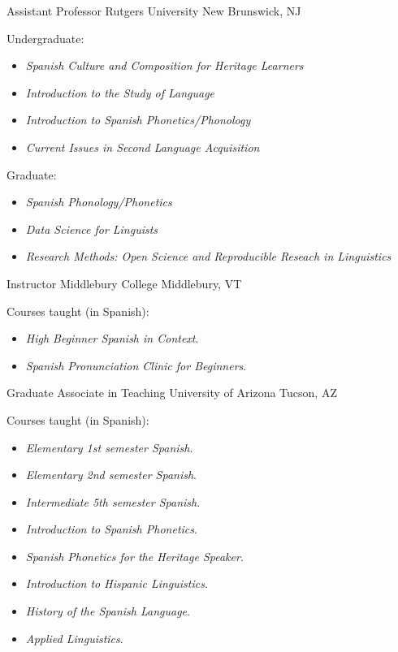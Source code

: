 \documentclass[11pt,letterpaper]{assets/tex/moderncv}
\begin{document}
        {Assistant Professor}
        {Rutgers University}
        {New Brunswick, NJ}
        {}
        {
        Undergraduate:
        \begin{itemize}
            \item[] \small \emph{Spanish Culture and Composition for Heritage Learners}
            \item[] \small \emph{Introduction to the Study of Language}
            \item[] \small \emph{Introduction to Spanish Phonetics/Phonology}
            \item[] \small \emph{Current Issues in Second Language Acquisition}
        \end{itemize}
        Graduate:
        \begin{itemize}
            \item[] \small \emph{Spanish Phonology/Phonetics}
            \item[] \small \emph{Data Science for Linguists}
            \item[] \small \emph{Research Methods: Open Science and Reproducible 
                                 Reseach in Linguistics}
        \end{itemize}
        }
        {Instructor}
        {Middlebury College}
        {Middlebury, VT}
        {}
        {Courses taught (in Spanish):
        \begin{itemize}
          \item[] \small \emph{High Beginner Spanish in Context}.\vspace{-.03in}
          \item[] \small \emph{Spanish Pronunciation Clinic for Beginners}.
        \end{itemize}}
        {Graduate Associate in Teaching}
        {University of Arizona}
        {Tucson, AZ}
        {}
        {Courses taught (in Spanish):
        \begin{itemize}
          \item[] \small \emph{Elementary 1st semester Spanish}.\vspace{-.03in}
          \item[] \small \emph{Elementary 2nd semester Spanish}.\vspace{-.03in}
          \item[] \small \emph{Intermediate 5th semester Spanish}.\vspace{-.03in}
          \item[] \small \emph{Introduction to Spanish Phonetics}.\vspace{-.03in}
          \item[] \small \emph{Spanish Phonetics for the Heritage Speaker}.\vspace{-.03in}
          \item[] \small \emph{Introduction to Hispanic Linguistics}.\vspace{-.03in}
          \item[] \small \emph{History of the Spanish Language}.\vspace{-.03in}
          \item[] \small \emph{Applied Linguistics}.
        \end{itemize}}
\end{document}
